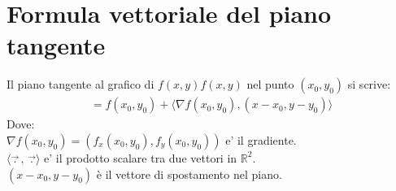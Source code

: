 \documentclass{article}
\begin{document}
\section*{Formula vettoriale del piano tangente}
Il piano tangente al grafico di $f(x,y)f(x,y)$ nel punto $(x_0,y_0)$ si scrive:
\begin{align*}
    =f(x_0,y_0)+\langle \nabla f(x_0,y_0),(x-x_0,y-y_0) \rangle
\end{align*}
Dove: \\
$\nabla f(x_0,y_0)=(f_x(x_0,y_0),f_y(x_0,y_0))$ e' il gradiente. \\
$\langle \vec{.} \, , \, \vec{.} \rangle$ e' il prodotto scalare tra due vettori in $\mathbb{R}^2$. \\
$(x-x_0,y-y_0)$ è il vettore di spostamento nel piano.
\end{document}
